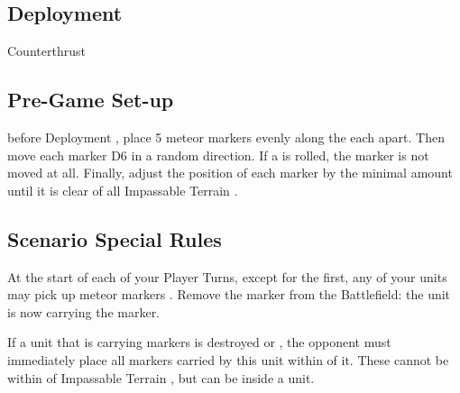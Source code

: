 
\label{MeteorShower}


\subsection*{Deployment}

 Counterthrust

\subsection*{Pre-Game Set-up}

 before  Deployment , place 5 meteor markers  evenly along the each  apart\rewordedrule{)}. Then move each marker D6\timess{} in a random direction. If a  is rolled, the marker is not moved at all. Finally, adjust the position of each marker by the minimal amount until it is  clear of all Impassable Terrain .


\subsection*{Scenario Special Rules}

At the start of each of your Player Turns, except for the first, any of your units may pick up meteor markers . Remove the marker from the Battlefield: the unit is now carrying the marker. 

If a unit that is carrying markers is destroyed or , the opponent must immediately place all markers carried by this unit  within  of it. These  cannot be within  of Impassable Terrain , but can be inside a unit.

